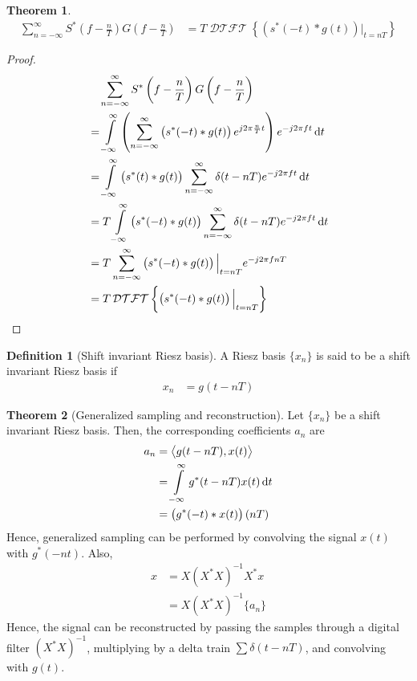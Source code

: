 \documentclass[titlepage, fleqn, a4paper, 12pt, twoside]{article}
\theoremstyle{definition}
\newtheorem{definition}{Definition}
\theoremstyle{theorem}
\newtheorem{theorem}{Theorem}
\DeclareMathOperator{\DTFT}{\mathcal{DTFT}}
\begin{document}
\begin{theorem}
	\begin{align*}
		\sum\limits_{n = -\infty}^{\infty} S^*\left( f - \frac{n}{T} \right) G\left( f - \frac{n}{T} \right) &= T \DTFT\left\{ \left( s^*(-t) \ast g(t) \right) \Big|_{t = n T} \right\}
	\end{align*}
\end{theorem}

\begin{proof}
	\begin{align*}
		&\quad \sum\limits_{n = -\infty}^{\infty} S^*\left( f - \frac{n}{T} \right) G\left( f - \frac{n}{T} \right)\\
		&= \int\limits_{-\infty}^{\infty} \left( \sum\limits_{n = -\infty}^{\infty} \left( s^*(-t) \ast g(t) \right) e^{j 2 \pi \frac{n}{T} t} \right) e^{-j 2 \pi f t} \dif t\\
		&= \int\limits_{-\infty}^{\infty} \left( s^*(t) \ast g(t) \right) \sum\limits_{n = -\infty}^{\infty} \delta(t - n T) e^{-j 2 \pi f t} \dif t\\
		&= T \int\limits_{-\infty}^{\infty} \left( s^*(-t) \ast g(t) \right) \sum\limits_{n = -\infty}^{\infty} \delta(t - n T) e^{-j 2 \pi f t} \dif t\\
		&= T \sum\limits_{n = -\infty}^{\infty} \left( s^*(-t) \ast g(t) \right) \Big|_{t = n T} e^{-j 2 \pi f n T}\\
		&= T \DTFT\left\{ \left( s^*(-t) \ast g(t) \right) \Big|_{t = n T} \right\}
	\end{align*}
\end{proof}

\begin{definition}[Shift invariant Riesz basis]
	A Riesz basis $\{x_n\}$ is said to be a shift invariant Riesz basis if
	\begin{align*}
		x_n &= g(t - n T)
	\end{align*}
\end{definition}

\begin{theorem}[Generalized sampling and reconstruction]
	Let $\{x_n\}$ be a shift invariant Riesz basis.
	Then, the corresponding coefficients $a_n$ are
	\begin{align*}
		a_n &= \left\langle g(t - n T) , x(t) \right\rangle\\
		&= \int\limits_{-\infty}^{\infty} g^*(t - n T) x(t) \dif t\\
		&= \left( g^*(-t) \ast x(t) \right)(n T)
	\end{align*}
	Hence, generalized sampling can be performed by convolving the signal $x(t)$ with $g^*(-n t)$.
	Also,
	\begin{align*}
		x &= X \left( X^* X \right)^{-1} X^* x\\
		&= X \left( X^* X \right)^{-1} \{a_n\}
	\end{align*}
	Hence, the signal can be reconstructed by passing the samples through a digital filter $\left( X^* X \right)^{-1}$, multiplying by a delta train $\sum \delta(t - n T)$, and convolving with $g(t)$.
	\label{thm:generalized_sampling_and_reconstruction}
\end{theorem}
\end{document}
